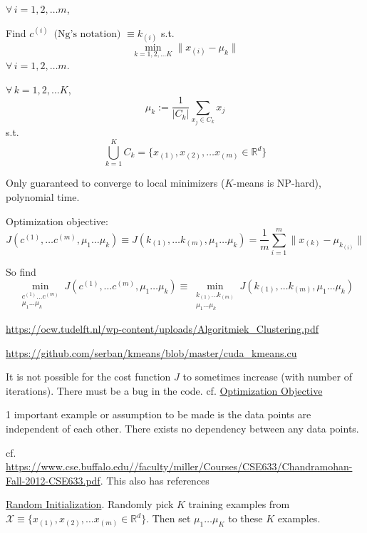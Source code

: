 \documentclass[10pt]{amsart}
\begin{document}
\begin{multicols*}{2}
$\forall \, i = 1,2,\dots m$, 

Find $c^{(i)} \, \text{ (Ng's notation) } \equiv k_{(i)} $ s.t. 
\[
\min_{k=1,2,\dots K} \| x_{(i)} - \mu_k \|
\]
$\forall \, i = 1,2,\dots m$.  

$\forall \, k =1,2,\dots K$, 
\[
\mu_k := \frac{1}{ |C_k | } \sum_{ x_j \in C_k} x_j
\]
s.t. 
\[
\bigcup_{k=1}^K C_k = \lbrace x_{(1)}, x_{(2)}, \dots x_{(m)} \in \mathbb{R}^d \rbrace
\]

Only guaranteed to converge to local minimizers ($K$-means is NP-hard), polynomial time.  

Optimization objective:
\begin{equation}
J(c^{(1)}, \dots c^{(m)}, \mu_1 \dots \mu_k) \equiv J(k_{(1)}, \dots k_{(m)}, \mu_1 \dots \mu_k) = \frac{1}{m} \sum_{i=1}^m \| x_{(k)} - \mu_{ k_{(i)} } \| 
\end{equation}

So find 
\begin{equation}
\min_{ \substack{ c^{(1)} \dots c^{(m)} \\ \mu_1 \dots \mu_k } } J(c^{(1)}, \dots c^{(m)}, \mu_1 \dots \mu_k) \equiv \min_{ \substack{ k_{(1)} \dots   k_{(m)} \\ \mu_1 \dots \mu_k } } J( k_{(1)}, \dots k_{(m)}, \mu_1 \dots \mu_k) 
\end{equation}

\url{https://ocw.tudelft.nl/wp-content/uploads/Algoritmiek_Clustering.pdf}

\url{https://github.com/serban/kmeans/blob/master/cuda_kmeans.cu}

It is not possible for the cost function $J$ to sometimes increase (with number of iterations).  There must be a bug in the code.  cf. \href{https://www.coursera.org/learn/machine-learning/lecture/G6QWt/optimization-objective}{Optimization Objective}

1 important example or assumption to be made is the data points are independent of each other.  There exists no dependency between any data points.   

cf. \url{https://www.cse.buffalo.edu//faculty/miller/Courses/CSE633/Chandramohan-Fall-2012-CSE633.pdf}.  This also has references

\href{https://www.coursera.org/learn/machine-learning/lecture/drcBh/random-initialization}{Random Initialization}.  Randomly pick $K$ training examples from $\mathcal{X} \equiv \lbrace x_{(1)}, x_{(2)}, \dots x_{(m)} \in \mathbb{R}^d \rbrace$.  Then set $\mu_1\dots \mu_K$ to these $K$ examples.  


\end{multicols*}
\end{document}
